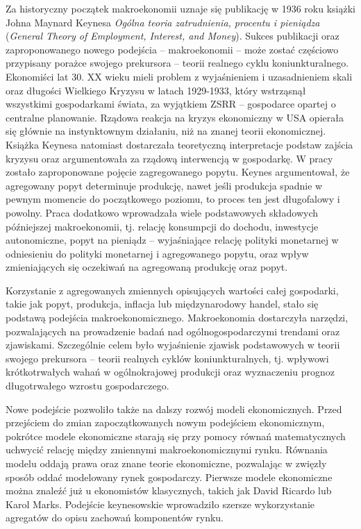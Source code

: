 Za historyczny początek makroekonomii uznaje się publikację w 1936 roku książki Johna Maynard Keynesa \emph{Ogólna teoria zatrudnienia, procentu i pieniądza} (\emph{General Theory of Employment, Interest, and Money}). Sukces publikacji oraz zaproponowanego nowego podejścia -- makroekonomii -- może zostać częściowo przypisany porażce swojego prekursora -- teorii realnego cyklu koniunkturalnego. Ekonomiści lat 30. XX wieku mieli problem z wyjaśnieniem i uzasadnieniem skali oraz długości Wielkiego Kryzysu w latach 1929-1933, który wstrząsnął wszystkimi gospodarkami świata, za wyjątkiem ZSRR -- gospodarce opartej o centralne planowanie. Rządowa reakcja na kryzys ekonomiczny w USA opierała się głównie na instynktownym działaniu, niż na znanej teorii ekonomicznej. Książka Keynesa natomiast dostarczała teoretyczną interpretacje podstaw zajścia kryzysu oraz argumentowała za rządową interwencją w gospodarkę\cite{blanchard-macroeconomics}. W pracy zostało zaproponowane pojęcie zagregowanego popytu. Keynes argumentował, że agregowany popyt determinuje produkcję, nawet jeśli produkcja spadnie w pewnym momencie do początkowego poziomu, to proces ten jest długofalowy i powolny. Praca dodatkowo wprowadzała wiele podstawowych składowych późniejszej makroekonomii, tj. relację konsumpcji do dochodu, inwestycje autonomiczne, popyt na pieniądz -- wyjaśniające relację polityki monetarnej w odniesieniu do polityki monetarnej i agregowanego popytu, oraz wpływ zmieniających się oczekiwań na agregowaną produkcję oraz popyt.

Korzystanie z agregowanych zmiennych opisujących wartości całej gospodarki, takie jak popyt, produkcja, inflacja lub międzynarodowy handel, stało się podstawą podejścia makroekonomicznego. Makroekonomia dostarczyła narzędzi, pozwalających na prowadzenie badań nad ogólnogospodarczymi trendami oraz zjawiskami. Szczególnie celem było wyjaśnienie zjawisk podstawowych w teorii swojego prekursora -- teorii realnych cyklów koniunkturalnych, tj. wpływowi krótkotrwałych wahań w ogólnokrajowej produkcji oraz wyznaczeniu prognoz długotrwałego wzrostu gospodarczego\cite{modern_macroeconomics}. 

Nowe podejście pozwoliło także na dalszy rozwój modeli ekonomicznych. Przed przejściem do zmian zapoczątkowanych nowym podejściem ekonomicznym, pokrótce modele ekonomiczne starają się przy pomocy równań matematycznych uchwycić relację między zmiennymi makroekonomicznymi rynku. Równania modelu oddają prawa oraz znane teorie ekonomiczne, pozwalając w zwięzły sposób oddać modelowany rynek gospodarczy. Pierwsze modele ekonomiczne można znaleźć już u ekonomistów klasycznych, takich jak David Ricardo lub Karol Marks. Podejście keynesowskie wprowadziło szersze wykorzystanie agregatów do opisu zachowań komponentów rynku.

